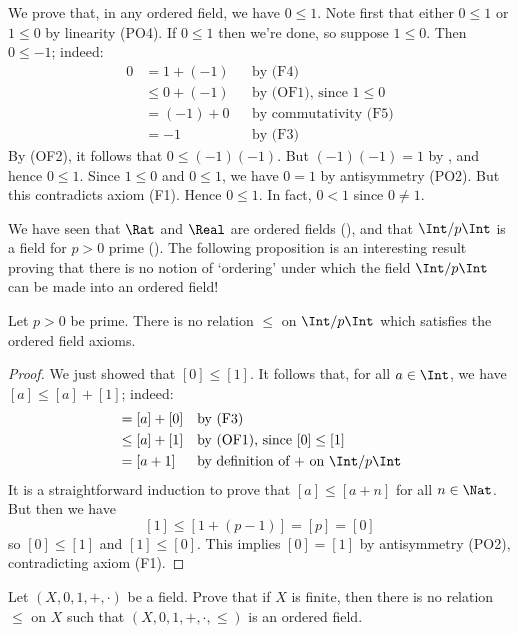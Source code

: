 \begin{example}
\label{exZeroIsLessThanOne}
We prove that, in any ordered field, we have $0 \le 1$. Note first that either $0 \le 1$ or $1 \le 0$ by linearity (PO4). If $0 \le 1$ then we're done, so suppose $1 \le 0$. Then $0 \le -1$; indeed:
\begin{align*}
0 &= 1 + (-1) && \text{by (F4)} \\
&\le 0+(-1) && \text{by (OF1), since $1 \le 0$} \\
&= (-1)+0 && \text{by commutativity (F5)} \\
&= -1 && \text{by (F3)}
\end{align*}
By (OF2), it follows that $0 \le (-1)(-1)$. But $(-1)(-1)=1$ by , and hence $0 \le 1$. Since $1 \le 0$ and $0 \le 1$, we have $0=1$ by antisymmetry (PO2). But this contradicts axiom (F1). Hence $0 \le 1$. In fact, $0<1$ since $0 \ne 1$.
\end{example}

We have seen that $\Rat$ and $\Real$ are ordered fields (), and that $\Int/p\Int$ is a field for $p>0$ prime (). The following proposition is an interesting result proving that there is no notion of `ordering' under which the field $\Int/p\Int$ can be made into an ordered field!

\begin{proposition}
Let $p>0$ be prime. There is no relation $\le$ on $\Int/p\Int$ which satisfies the ordered field axioms.
\end{proposition}
\begin{proof}
We just showed that $[0] \le [1]$. It follows that, for all $a \in \Int$, we have $[a] \le [a]+[1]$; indeed:
\begin{align*}
[a] &= [a]+[0] && \text{by (F3)} \\
&\le [a]+[1] && \text{by (OF1), since $[0] \le [1]$} \\
&= [a+1] && \text{by definition of $+$ on $\Int/p\Int$}
\end{align*}
It is a straightforward induction to prove that $[a] \le [a+n]$ for all $n \in \Nat$. But then we have
\[ [1] \le [1+(p-1)] = [p] = [0] \]
so $[0] \le [1]$ and $[1] \le [0]$. This implies $[0]=[1]$ by antisymmetry (PO2), contradicting axiom (F1).
\end{proof}

\begin{exercise}
Let $(X,0,1,+,{\cdot})$ be a field. Prove that if $X$ is finite, then there is no relation $\le$ on $X$ such that $(X,0,1,+,{\cdot},{\le})$ is an ordered field.
\end{exercise}


